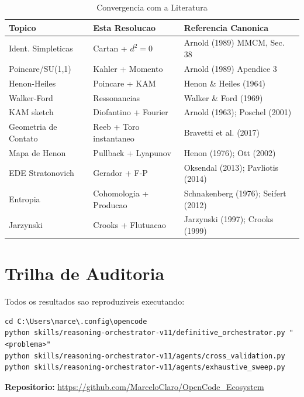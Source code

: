 \documentclass[12pt,a4paper,oneside]{article}
\begin{document}
\begin{table}[H]
\centering
\caption{Convergencia com a Literatura}
\footnotesize
\begin{tabular}{lp{4cm}p{4cm}}
\toprule
\textbf{Topico} & \textbf{Esta Resolucao} & \textbf{Referencia Canonica}\\
\midrule
Ident. Simpleticas & Cartan + $d^2=0$ & Arnold (1989) MMCM, Sec. 38\\
Poincare/SU(1,1) & Kahler + Momento & Arnold (1989) Apendice 3\\
Henon-Heiles & Poincare + KAM & Henon \& Heiles (1964)\\
Walker-Ford & Ressonancias & Walker \& Ford (1969)\\
KAM sketch & Diofantino + Fourier & Arnold (1963); Poschel (2001)\\
Geometria de Contato & Reeb + Toro instantaneo & Bravetti et al. (2017)\\
Mapa de Henon & Pullback + Lyapunov & Henon (1976); Ott (2002)\\
EDE Stratonovich & Gerador + F-P & Oksendal (2013); Pavliotis (2014)\\
Entropia & Cohomologia + Producao & Schnakenberg (1976); Seifert (2012)\\
Jarzynski & Crooks + Flutuacao & Jarzynski (1997); Crooks (1999)\\
\bottomrule
\end{tabular}
\end{table}

\section{Trilha de Auditoria}

Todos os resultados sao reproduziveis executando:

\begin{verbatim}
cd C:\Users\marce\.config\opencode
python skills/reasoning-orchestrator-v11/definitive_orchestrator.py "<problema>"
python skills/reasoning-orchestrator-v11/agents/cross_validation.py
python skills/reasoning-orchestrator-v11/agents/exhaustive_sweep.py
\end{verbatim}

\textbf{Repositorio:} \url{https://github.com/MarceloClaro/OpenCode_Ecosystem}
\end{document}
